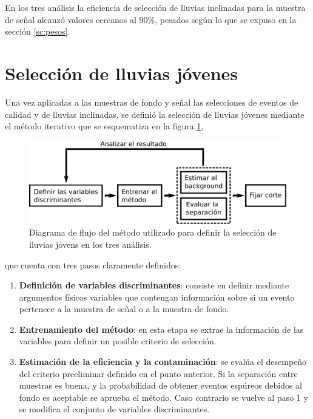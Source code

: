 		En los tres análisis la eficiencia de selección de lluvias inclinadas para la muestra de señal alcanz\'o valores cercanos al $90\%$, pesados según lo que se expuso en la sección \ref{sc:pesos}.
		
\section{Selecci\'on de lluvias j\'ovenes}
\label{sc:selNu}
	
	Una vez aplicadas a las muestras de fondo y señal las selecciones de eventos de calidad y de lluvias inclinadas, se definió la selección de lluvias jóvenes mediante el método iterativo que se esquematiza en la figura \ref{fig:entrenamiento},
	\begin{figure}[ht!]
		\begin{center}
		\includegraphics[width=1.0\textwidth]{fig/seleccionAuger/entrenamiento}
		\caption{Diagrama de flujo del método utilizado para definir la selección de lluvias jóvens en los tres análisis.}
		\label{fig:entrenamiento}
		\end{center}
	\end{figure}
	que cuenta con tres pasos claramente definidos:
	\begin{enumerate}
	 \item \textbf{Definición de variables discriminantes}: consiste en definir mediante argumentos físicos variables que contengan información sobre si un evento pertenece a la muestra de señal o a la muestra de fondo.
	 \item \textbf{Entrenamiento del método}: en esta etapa se extrae la información de las variables para definir un posible criterio de selección. 
	 \item \textbf{Estimación de la eficiencia y la contaminación}: se eval\'ua el desempe\~no del criterio preeliminar definido en el punto anterior. Si la separación entre muestras es buena, y la probabilidad de obtener eventos espúreos debidos al fondo es aceptable se aprueba el método. Caso contrario se vuelve al paso 1 y se modifica el conjunto de variables discriminantes.
	\end{enumerate}
